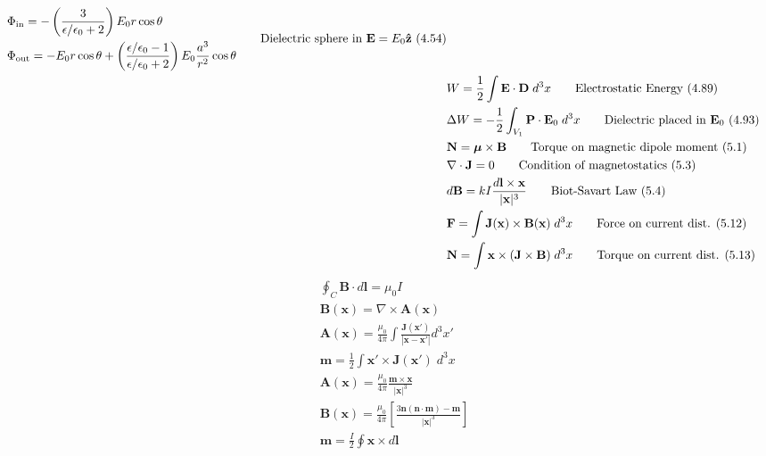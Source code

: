 \documentclass[10pt]{article}
\newcommand{\zhat}{\boldsymbol{\hat{\textbf{z}}}}
\newcommand{\vect}[1]{\boldsymbol{\mathbf{#1}}}
\newcommand{\eo}{\epsilon_0}
\begin{document}
\begin{multicols}{2}
\begin{align*}
		\begin{split}
			&\Phi_{\text{in}} = - \left( \frac{3}{\epsilon/\eo + 2} \right) E_0 r \cos \theta \\ 
			&\Phi_{\text{out}} = - E_0 r \cos \theta + \left( \frac{\epsilon/\eo - 1}{\epsilon/\eo + 2} \right) E_0 \frac{a^3}{r^2} \cos \theta 
		\end{split} \tag*{Dielectric sphere in $\vect{E} = E_0 \zhat$ (4.54)} \\
		& W = \frac{1}{2} \int \vect{E} \cdot \vect{D} \; d^3x \tag*{Electrostatic Energy (4.89)} \\
		& \Delta W = - \frac{1}{2} \int_{V_1} \vect{P} \cdot \vect{E}_0 \; d^3 x \tag*{Dielectric placed in $\vect{E}_0$ (4.93)} \\
		& \vect{N} = \vect{\mu} \times \vect{B} \tag*{Torque on magnetic dipole moment (5.1)} \\
		& \nabla \cdot \vect{J} = 0 \tag*{Condition of magnetostatics (5.3)} \\
		& d \vect{B} = k I \frac{d \vect{l} \times \vect{x}}{|\vect{x}|^3} \tag*{Biot-Savart Law (5.4)} \\
		& \vect{F} = \int \vect{J}(\vect{x}) \times \vect{B}(\vect{x}) \; d^3 x \tag*{Force on current dist. (5.12)} \\
		& \vect{N} = \int \vect{x} \times (\vect{J} \times \vect{B}) \; d^3 x \tag*{Torque on current dist. (5.13)} \\
	\end{align*}
	\begin{align*} 
		& \oint_C \vect{B} \cdot d \vect{l} = \mu_0 I \tag*{Amp\`ere's law (5.25)}\\
		& \vect{B}(\vect{x}) = \nabla \times \vect{A}(\vect{x}) \tag*{Magnetic vector potential (5.27)} \\
		& \vect{A}(\vect{x}) = \frac{\mu_0}{4 \pi} \int \frac{\vect{J}(\vect{x}')}{|\vect{x}-\vect{x}'|} d^3 x' \tag*{MVP, current dist. (5.32)} \\
		& \vect{m} = \frac{1}{2} \int \vect{x}' \times \vect{J}(\vect{x}') \; d^3 x \tag*{Magnetic moment def. (5.54)} \\
		& \vect{A}(\vect{x}) = \frac{\mu_0}{4 \pi} \frac{\vect{m} \times \vect{x}}{|\vect{x}|^3} \tag*{Dipole vector potential (5.55)} \\
		& \vect{B}(\vect{x}) = \frac{\mu_0}{4 \pi} \left[ \frac{3 \vect{n}(\vect{n} \cdot \vect{m}) - \vect{m}}{|\vect{x}|^3} \right]\tag*{Dipole induction (5.56)}\\
		& \vect{m} = \frac{I}{2} \oint \vect{x} \times d \vect{l} \tag*{Mag. moment of closed circuit} \\

\end{align*}
\end{multicols}
\end{document}
